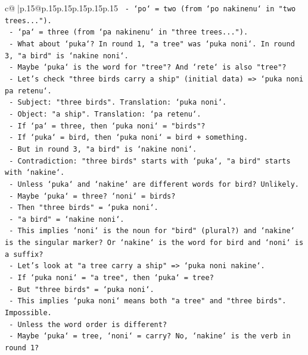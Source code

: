 \documentclass{article}
\begin{document}
{\begin{supertabular}{c@{$\;$}|p{.15\linewidth}@{}p{.15\linewidth}p{.15\linewidth}p{.15\linewidth}p{.15\linewidth}p{.15\linewidth}}
{{{\texttt{    {-} `po` = two (from `po nakinenu` in "two trees...").} \\
\texttt{    {-} `pa` = three (from `pa nakinenu` in "three trees...").} \\
\texttt{    {-} What about `puka`? In round 1, "a tree" was `puka noni`. In round 3, "a bird" is `nakine noni`.} \\
\texttt{    {-} Maybe `puka` is the word for "tree"? And `rete` is also "tree"?} \\
\texttt{    {-} Let's check "three birds carry a ship" (initial data) => `puka noni pa retenu`.} \\
\texttt{      {-} Subject: "three birds". Translation: `puka noni`.} \\
\texttt{      {-} Object: "a ship". Translation: `pa retenu`.} \\
\texttt{      {-} If `pa` = three, then `puka noni` = "birds"?} \\
\texttt{      {-} If `puka` = bird, then `puka noni` = bird + something.} \\
\texttt{      {-} But in round 3, "a bird" is `nakine noni`.} \\
\texttt{      {-} Contradiction: "three birds" starts with `puka`, "a bird" starts with `nakine`.} \\
\texttt{      {-} Unless `puka` and `nakine` are different words for bird? Unlikely.} \\
\texttt{      {-} Maybe `puka` = three? `noni` = birds?} \\
\texttt{      {-} Then "three birds" = `puka noni`.} \\
\texttt{      {-} "a bird" = `nakine noni`.} \\
\texttt{      {-} This implies `noni` is the noun for "bird" (plural?) and `nakine` is the singular marker? Or `nakine` is the word for bird and `noni` is a suffix?} \\
\texttt{      {-} Let's look at "a tree carry a ship" => `puka noni nakine`.} \\
\texttt{        {-} If `puka noni` = "a tree", then `puka` = tree?} \\
\texttt{        {-} But "three birds" = `puka noni`.} \\
\texttt{        {-} This implies `puka noni` means both "a tree" and "three birds". Impossible.} \\
\texttt{        {-} Unless the word order is different?} \\
\texttt{        {-} Maybe `puka` = tree, `noni` = carry? No, `nakine` is the verb in round 1?} \\
}}}
\end{supertabular}}
\end{document}
